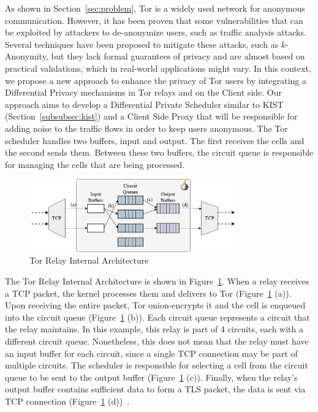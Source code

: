 As shown in Section~\ref{sec:problem}, Tor is a widely used network for anonymous communication. However, it has been proven that some vulnerabilities that can be exploited by attackers to de-anonymize users, such as traffic analysis attacks. Several techniques have been proposed to mitigate these attacks, such as \(k\)-Anonymity, but they lack formal guarantees of privacy and are almost based on practical validations, which in real-world applications might vary. In this context, we propose a new approach to enhance the privacy of Tor users by integrating a Differential Privacy mechanisms in Tor relays and on the Client side. Our approach aims to develop a Differential Private Scheduler similar to KIST (Section~\ref{subsubsec:kist}) and a Client Side Proxy that will be responsible for adding noise to the traffic flows in order to keep users anonymous. 
The Tor scheduler handles two buffers, input and output. The first receives the cells and the second sends them. Between these two buffers, the circuit queue is responsible for managing the cells that are being processed. 

\begin{figure}
    \centering
    \includegraphics[width=0.8\textwidth]{Chapters/Figures/Fig1.png}
    \caption{Tor Relay Internal Architecture}\label{fig:initial_system_model}
\end{figure}

The Tor Relay Internal Architecture is shown in Figure~\ref{fig:initial_system_model}. 
When a relay receives a TCP packet, the kernel processes them and delivers to Tor (Figure~\ref{fig:initial_system_model} (a)).
Upon receiving the entire packet, Tor onion-encrypts it and the cell is enqueued into the circuit queue (Figure~\ref{fig:initial_system_model} (b)). 
Each circuit queue represents a circuit that the relay maintains. In this example, this relay is part of 4 circuits, each with a different circuit queue. Nonetheless, this does not mean that the relay must have an input buffer for each circuit, since a single TCP connection may be part of multiple circuits. 
The scheduler is responsible for selecting a cell from the circuit queue to be sent to the output buffer (Figure~\ref{fig:initial_system_model} (c)).
Finally, when the relay's output buffer contains sufficient data to form a TLS packet, the data is sent via TCP connection (Figure~\ref{fig:initial_system_model} (d))~\cite{KIST, EWMA}.


